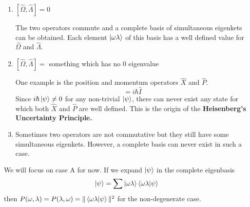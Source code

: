 \documentclass[12pt,a4paper]{report}
\begin{document}
\begin{enumerate}[label=\Alph*)]
    \item $[\hat{\Omega}, \hat{\Lambda}] = 0$
    
    The two operators commute and a complete basis of simultaneous eigenkets can be obtained. Each element $\ket{\omega\lambda}$ of 
    this basis has a well defined value for $\hat{\Omega}$ and $\hat{\Lambda}$.

    \item $[\hat{\Omega}, \hat{\Lambda}] = $ something which has no 0 eigenvalue
    
    One example is the position and momentum operators $\hat{X}$ and $\hat{P}$.
    \begin{equation*}
        [\hat{X}, \hat{P}] = i\hbar \hat{I}
    \end{equation*}
    Since $i\hbar\ket{\psi} \neq 0$ for any non-trivial $\ket{\psi}$, there can never exist any state for which both $\hat{X}$ and $\hat{P}$ are well defined.
    This is the origin of the \textbf{Heisenberg's Uncertainty Principle.}

    \item Sometimes two operators are not commutative but they still have some simultaneous eigenkets. However, a complete basis can never exist in such a case.
\end{enumerate}

We will focus on case A for now. If we expand $\ket{\psi}$ in the complete eigenbasis
\begin{equation*}
    \ket{\psi} = \sum \ket{\omega\lambda}\bra{\omega\lambda}\ket{\psi}
\end{equation*}
then $P(\omega, \lambda) = P(\lambda, \omega) = \| \bra{\omega\lambda}\ket{\psi} \|^2$ for the non-degenerate case.
\end{document}
